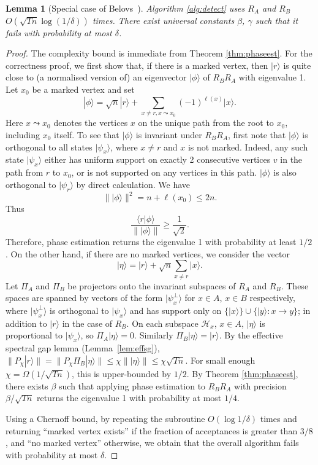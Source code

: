 \documentclass[11pt]{article}
\newcommand{\ket}[1]{| #1 \rangle}
\newcommand{\ip}[2]{\langle #1|#2 \rangle}
\newcommand{\be}{\begin{equation}}
\newcommand{\ee}{\end{equation}}
\newtheorem{lem}[thm]{Lemma}
\begin{document}
\begin{lem}[Special case of Belovs~\cite{belovs13}]
\label{lem:algdetect}
Algorithm \ref{alg:detect} uses $R_A$ and $R_B$ $O(\sqrt{Tn} \log(1/\delta))$ times. There exist universal constants $\beta$, $\gamma$ such that it fails with probability at most $\delta$.
\end{lem}

\begin{proof}
The complexity bound is immediate from Theorem \ref{thm:phaseest}. For the correctness proof, we first show that, if there is a marked vertex, then $\ket{r}$ is quite close to (a normalised version of) an eigenvector $\ket{\phi}$ of $R_B R_A$ with eigenvalue 1. Let $x_0$ be a marked vertex and set
%
\be \label{eq:phi} \ket{\phi} = \sqrt{n} \ket{r} + \sum_{x \neq r, x \leadsto x_0} (-1)^{\ell(x)} \ket{x}. \ee
%
Here $x \leadsto x_0$ denotes the vertices $x$ on the unique path from the root to $x_0$, including $x_0$ itself. To see that $\ket{\phi}$ is invariant under $R_B R_A$, first note that $\ket{\phi}$ is orthogonal to all states $\ket{\psi_x}$, where $x \neq r$ and $x$ is not marked. Indeed, any such state $\ket{\psi_x}$ either has uniform support on exactly 2 consecutive vertices $v$ in the path from $r$ to $x_0$, or is not supported on any vertices in this path. $\ket{\phi}$ is also orthogonal to $\ket{\psi_r}$ by direct calculation. We have
%
\[ \|\ket{\phi}\|^2 = n + \ell(x_0) \le 2 n. \]
%
Thus
%
\[ \frac{\ip{r}{\phi}}{\|\ket{\phi}\|} \ge \frac{1}{\sqrt{2}}. \]
%
Therefore, phase estimation returns the eigenvalue 1 with probability at least $1/2$. On the other hand, if there are no marked vertices, we consider the vector
%
\[ \ket{\eta} = \ket{r} + \sqrt{n} \sum_{x \neq r} \ket{x}. \]
%
Let $\Pi_A$ and $\Pi_B$ be projectors onto the invariant subspaces of $R_A$ and $R_B$. These spaces are spanned by vectors of the form $\ket{\psi_x^\perp}$ for $x \in A$, $x \in B$ respectively, where $\ket{\psi_x^\perp}$ is orthogonal to $\ket{\psi_x}$ and has support only on $\{\ket{x}\} \cup \{ \ket{y}: x \rightarrow y \}$; in addition to $\ket{r}$ in the case of $R_B$. %
On each subspace $\mathcal{H}_x$, $x \in A$, $\ket{\eta}$ is proportional to $\ket{\psi_x}$, so $\Pi_A \ket{\eta} = 0$. Similarly $\Pi_B \ket{\eta} = \ket{r}$. By the effective spectral gap lemma (Lemma~\ref{lem:effsg}), $\|P_\chi \ket{r} \| = \|P_\chi \Pi_B \ket{\eta}\| \le \chi \|\ket{\eta}\| \le \chi \sqrt{Tn}$. For small enough $\chi = \Omega(1/\sqrt{Tn})$, this is upper-bounded by $1/2$. By Theorem \ref{thm:phaseest}, there exists $\beta$ such that applying phase estimation to $R_B R_A$ with precision $\beta/\sqrt{Tn}$ returns the eigenvalue 1 with probability at most $1/4$.

Using a Chernoff bound, by repeating the subroutine $O(\log 1/\delta)$ times and returning ``marked vertex exists'' if the fraction of acceptances is greater than $3/8$, and ``no marked vertex'' otherwise, we obtain that the overall algorithm fails with probability at most $\delta$.
\end{proof}
\end{document}
